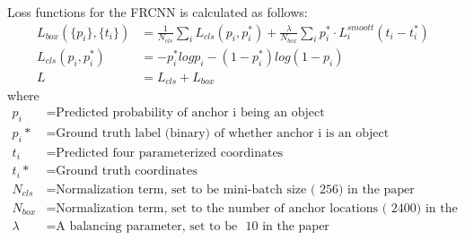 \documentclass[12pt]{article}
\begin{document}
Loss functions for the FRCNN is calculated as follows:
\begin{align}
	L_{box}(\{p_i\},\{t_i\}) &= \frac{1}{N_{cls}}\sum_{i}{}L_{cls}(p_i, p_i^*) + \frac{\lambda}{N_{box}}\sum_{i}{}p_i^* \cdot L_i^{smoott}(t_i - t_i^*) \\	
	L_{cls}(p_i, p_i^*) &= -p_i^* logp_i - (1 - p_i^*)log(1 - p_i) \\
	L &= L_{cls} + L_{box}
\end{align} where 
\begin{align*}
	p_i &= \text{Predicted probability of anchor i being an object} \\
	p_i* &= \text{Ground truth label (binary) of whether anchor i is an object} \\
	t_i &= \text{Predicted four parameterized coordinates} \\
	t_i* &= \text{Ground truth coordinates} \\
	N_{cls} &= \text{Normalization term, set to be mini-batch size (~256) in the paper} \\
	N_{box} &= \text{Normalization term, set to the number of anchor locations (~2400) in the paper} \\
	\lambda &= \text{A balancing parameter, set to be ~10 in the paper } 
\end{align*}
\end{document}
